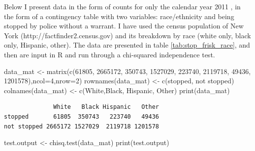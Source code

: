 \documentclass[
  letterpaper,
  DIV=11,
  numbers=noendperiod]{scrreprt}
\newenvironment{Shaded}{\begin{snugshade}}{\end{snugshade}}
\newcommand{\AttributeTok}[1]{\textcolor[rgb]{0.40,0.45,0.13}{#1}}
\newcommand{\DecValTok}[1]{\textcolor[rgb]{0.68,0.00,0.00}{#1}}
\newcommand{\FunctionTok}[1]{\textcolor[rgb]{0.28,0.35,0.67}{#1}}
\newcommand{\NormalTok}[1]{\textcolor[rgb]{0.00,0.23,0.31}{#1}}
\newcommand{\OtherTok}[1]{\textcolor[rgb]{0.00,0.23,0.31}{#1}}
\newcommand{\StringTok}[1]{\textcolor[rgb]{0.13,0.47,0.30}{#1}}
\begin{document}
Below I present data in the form of counts for only the calendar year
2011 \cite{_nypds_????}, in the form of a contingency table with two
variables: race/ethnicity and being stopped by police without a warrant.
I have used the census population of New York
(http://factfinder2.census.gov) and its breakdown by race (white only,
black only, Hispanic, other). The data are presented in table
\ref{tab:stop_frisk_race}, and then are input in R and run through a
chi-squared independence test.

\begin{Shaded}
\begin{Highlighting}[]
\NormalTok{data\_mat }\OtherTok{\textless{}{-}} \FunctionTok{matrix}\NormalTok{(}\FunctionTok{c}\NormalTok{(}\DecValTok{61805}\NormalTok{, }\DecValTok{2665172}\NormalTok{, }\DecValTok{350743}\NormalTok{, }\DecValTok{1527029}\NormalTok{, }\DecValTok{223740}\NormalTok{, }
\DecValTok{2119718}\NormalTok{, }\DecValTok{49436}\NormalTok{, }\DecValTok{1201578}\NormalTok{),}\AttributeTok{ncol=}\DecValTok{4}\NormalTok{,}\AttributeTok{nrow=}\DecValTok{2}\NormalTok{)}
\FunctionTok{rownames}\NormalTok{(data\_mat) }\OtherTok{\textless{}{-}} \FunctionTok{c}\NormalTok{(}\StringTok{\textquotesingle{}stopped\textquotesingle{}}\NormalTok{, }\StringTok{\textquotesingle{}not stopped\textquotesingle{}}\NormalTok{)}
\FunctionTok{colnames}\NormalTok{(data\_mat) }\OtherTok{\textless{}{-}} \FunctionTok{c}\NormalTok{(}\StringTok{\textquotesingle{}White\textquotesingle{}}\NormalTok{,}\StringTok{\textquotesingle{}Black\textquotesingle{}}\NormalTok{, }\StringTok{\textquotesingle{}Hispanic\textquotesingle{}}\NormalTok{, }\StringTok{\textquotesingle{}Other\textquotesingle{}}\NormalTok{)}
\FunctionTok{print}\NormalTok{(data\_mat)}
\end{Highlighting}
\end{Shaded}

\begin{verbatim}
              White   Black Hispanic   Other
stopped       61805  350743   223740   49436
not stopped 2665172 1527029  2119718 1201578
\end{verbatim}

\begin{Shaded}
\begin{Highlighting}[]
\NormalTok{test.output }\OtherTok{\textless{}{-}} \FunctionTok{chisq.test}\NormalTok{(data\_mat)}
\FunctionTok{print}\NormalTok{(test.output)}
\end{Highlighting}
\end{Shaded}
\end{document}
